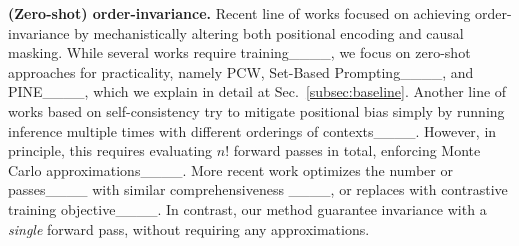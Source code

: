 \noindent \textbf{(Zero-shot) order-invariance.}
Recent line of works focused on achieving order-invariance by mechanistically altering both positional encoding and causal masking.
While several works require training____, we focus on zero-shot approaches for practicality, namely
PCW, Set-Based Prompting____, and PINE____, which we explain in detail at Sec.~\ref{subsec:baseline}. %
Another line of works based on self-consistency try to mitigate positional bias simply by running inference multiple times with different orderings of contexts____. However, in principle, this requires evaluating \(n!\) forward passes in total, enforcing Monte Carlo approximations____. More recent work optimizes the number or passes____ with similar comprehensiveness ____, or replaces with contrastive training objective____. In contrast, our method guarantee invariance with a \textit{single} forward pass, without requiring any approximations.